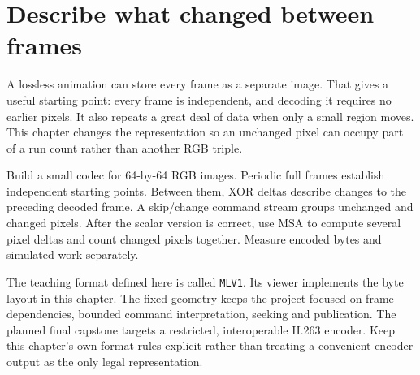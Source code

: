 \section{Describe what changed between frames}
A lossless animation can store every frame as a separate image. That gives a useful
starting point: every frame is independent, and decoding it requires no earlier
pixels. It also repeats a great deal of data when only a small region moves. This
chapter changes the representation so an unchanged pixel can occupy part of a run
count rather than another RGB triple.

Build a small codec for 64-by-64 RGB images. Periodic full frames establish independent
starting points. Between them, XOR deltas describe changes to the preceding decoded
frame. A skip/change command stream groups unchanged and changed pixels. After the
scalar version is correct, use MSA to compute several pixel deltas and count changed
pixels together. Measure encoded bytes and simulated work separately.

The teaching format defined here is called \texttt{MLV1}. Its viewer implements the
byte layout in this chapter. The fixed geometry keeps the project focused on frame
dependencies, bounded command interpretation, seeking and publication. The planned final
capstone targets a restricted, interoperable H.263 encoder. Keep this chapter's
own format rules explicit rather than treating a convenient encoder output as the
only legal representation.
